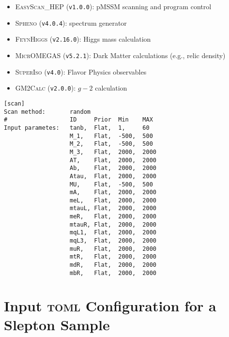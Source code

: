 \documentclass{article}
\newcommand{\easyscanhep}{\textsc{EasyScan\_HEP}}
\newcommand{\spheno}{\textsc{Spheno}}
\newcommand{\feynhiggs}{\textsc{FeynHiggs}}
\newcommand{\micromegas}{\textsc{MicrOMEGAS}}
\newcommand{\superiso}{\textsc{SuperIso}}
\newcommand{\gmtwocalc}{\textsc{GM2Calc}}
\newcommand{\toml}{\textsc{toml}}
\begin{document}
\begin{itemize}
	\item \easyscanhep{} (\texttt{v1.0.0}): pMSSM scanning and program control~\cite{Shang:2023gfy,Han:2016gvr}
	\item \spheno{} (\texttt{v4.0.4}): spectrum generator~\cite{Porod:2003um,Porod:2011nf}
	\item \feynhiggs{} (\texttt{v2.16.0}): Higgs mass calculation~\cite{Bahl:2018qog,Bahl:2017aev,Bahl:2016brp,Hahn:2013ria,Frank:2006yh,Degrassi:2002fi,Heinemeyer:1998np,Heinemeyer:1998yj}
	\item \micromegas{} (\texttt{v5.2.1}): Dark Matter calculations (e.g., relic density)~\cite{Belanger:2020gnr}
	\item \superiso{} (\texttt{v4.0}): Flavor Physics observables~\cite{Arbey:2018msw}
	\item \gmtwocalc{} (\texttt{v2.0.0}): $g-2$ calculation~\cite{Athron:2015rva,Athron:2021evk}
\end{itemize}

\begin{listing}[H]
	\begin{verbatim}
[scan]
Scan method:       random
#                  ID     Prior  Min    MAX
Input parametes:   tanb,  Flat,  1,     60
                   M_1,   Flat,  -500,  500
                   M_2,   Flat,  -500,  500
                   M_3,   Flat,  2000,  2000
                   AT,    Flat,  2000,  2000
                   Ab,    Flat,  2000,  2000
                   Atau,  Flat,  2000,  2000
                   MU,    Flat,  -500,  500
                   mA,    Flat,  2000,  2000
                   meL,   Flat,  2000,  2000
                   mtauL, Flat,  2000,  2000
                   meR,   Flat,  2000,  2000
                   mtauR, Flat,  2000,  2000
                   mqL1,  Flat,  2000,  2000
                   mqL3,  Flat,  2000,  2000
                   muR,   Flat,  2000,  2000
                   mtR,   Flat,  2000,  2000
                   mdR,   Flat,  2000,  2000
                   mbR,   Flat,  2000,  2000
  \end{verbatim}
	\caption{A portion of the \texttt{easyscan.ini} configuration defining the random sampling for the electroweakinos scan.}
	\label{lst:easyscanini}
\end{listing}

\section{Input \toml{} Configuration for a Slepton Sample}
\label{sec:input-configuration-for-a-slepton-sample}
\end{document}
